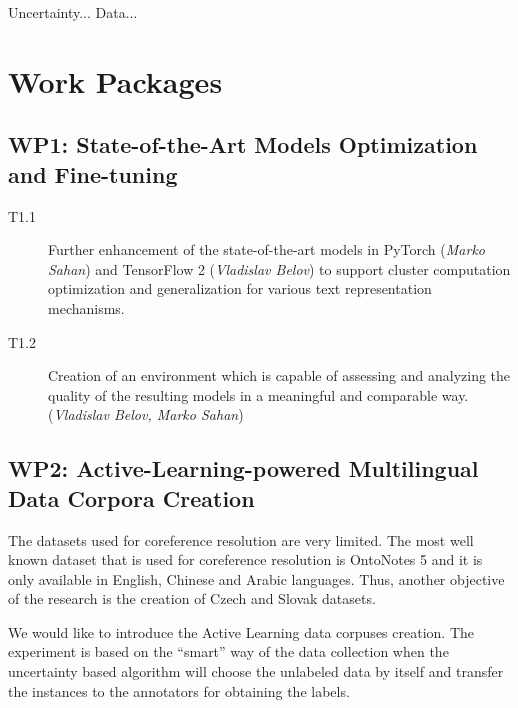 {\color{red}
Uncertainty...
Data...
}

\section{Work Packages}\label{sec:wp}

\subsection*{WP1: State-of-the-Art Models Optimization and Fine-tuning}

\begin{description}
	\item [T1.1] Further enhancement of the state-of-the-art models in PyTorch (\textit{Marko Sahan}) and TensorFlow 2 (\textit{Vladislav Belov}) to support cluster computation optimization and generalization for various text representation mechanisms.
	\item [T1.2] Creation of an environment which is capable of assessing and analyzing the quality of the resulting models in a meaningful and comparable way. (\textit{Vladislav Belov, Marko Sahan})

\end{description}


\subsection*{WP2: Active-Learning-powered Multilingual Data Corpora Creation}

 The datasets used for coreference resolution are very limited. The most well known dataset that is used for coreference resolution is OntoNotes 5 \cite{ontonotes5-Weischedel2013} and it is only available in English, Chinese and Arabic languages. Thus, another objective of the research is the creation of Czech and Slovak datasets.

We would like to introduce the Active Learning data corpuses creation. The experiment is based on the “smart” way of the data collection when the uncertainty based algorithm will choose the unlabeled data by itself and transfer the instances to the annotators for obtaining the labels. 

